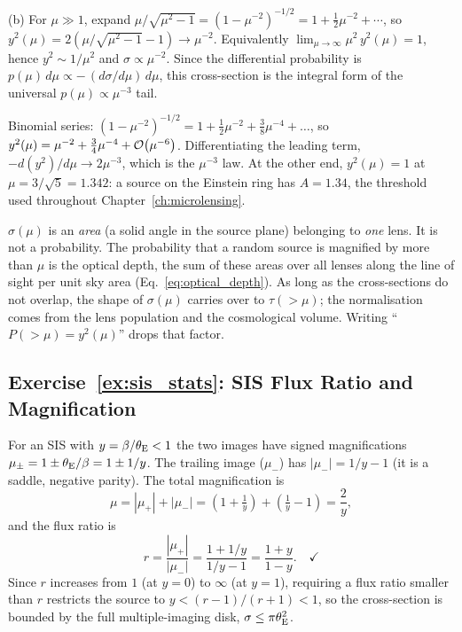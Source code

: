 (b) For $\mu \gg 1$, expand
$\mu/\sqrt{\mu^2-1} = (1-\mu^{-2})^{-1/2} = 1 + \tfrac12\mu^{-2} + \cdots$,
so $y^2(\mu) = 2(\mu/\sqrt{\mu^2-1} - 1) \to \mu^{-2}$.  Equivalently
$\lim_{\mu\to\infty}\mu^2\,y^2(\mu) = 1$, hence $y^2 \sim 1/\mu^2$ and
$\sigma \propto \mu^{-2}$. \checkmark  Since the differential probability
is $p(\mu)\,d\mu \propto -\,(d\sigma/d\mu)\,d\mu$, this cross-section is
the integral form of the universal $p(\mu)\propto\mu^{-3}$ tail.

\begin{derivation}
Binomial series: $(1-\mu^{-2})^{-1/2} = 1 + \tfrac12\mu^{-2} +
\tfrac38\mu^{-4} + \dots$, so
$y^2(\mu) = \mu^{-2} + \tfrac34\mu^{-4} + \mathcal{O}\!\left(\mu^{-6}\right)$.  Differentiating
the leading term, $-d(y^2)/d\mu \to 2\mu^{-3}$, which is the $\mu^{-3}$ law.
At the other end, $y^2(\mu) = 1$ at $\mu = 3/\sqrt5 = 1.342$: a source on the
Einstein ring has $A = 1.34$, the threshold used throughout
Chapter~\ref{ch:microlensing}.
\end{derivation}

\begin{annotation}
$\sigma(\mu)$ is an \emph{area} (a solid angle in the source plane) belonging
to \emph{one} lens.  It is not a probability.  The probability that a random
source is magnified by more than $\mu$ is the optical depth, the sum of
these areas over all lenses along the line of sight per unit sky area
(Eq.~\eqref{eq:optical_depth}).  As long as the cross-sections do not
overlap, the shape of $\sigma(\mu)$ carries over to $\tau(>\mu)$; the
normalisation comes from the lens population and the cosmological volume.
Writing ``$P(>\mu) = y^2(\mu)$'' drops that factor.
\end{annotation}

\subsection*{Exercise~\ref{ex:sis_stats}: SIS Flux Ratio and Magnification}

For an SIS with $y = \beta/\theta_{\mathrm{E}} < 1$ the two images have signed
magnifications $\mu_\pm = 1 \pm \theta_{\mathrm{E}}/\beta = 1 \pm 1/y$.  The trailing
image ($\mu_-$) has $|\mu_-| = 1/y - 1$ (it is a saddle, negative parity).
The total magnification is
\[
    \mu = |\mu_+| + |\mu_-| = \left(1+\tfrac1y\right)
    + \left(\tfrac1y-1\right) = \frac{2}{y},
\]
and the flux ratio is
\[
    r = \frac{|\mu_+|}{|\mu_-|}
    = \frac{1+1/y}{1/y-1} = \frac{1+y}{1-y}. \quad\checkmark
\]
Since $r$ increases from $1$ (at $y=0$) to $\infty$ (at $y=1$), requiring a
flux ratio smaller than $r$ restricts the source to $y < (r-1)/(r+1) < 1$,
so the cross-section is bounded by the full multiple-imaging disk,
$\sigma \le \pi\theta_{\mathrm{E}}^2$. \checkmark


